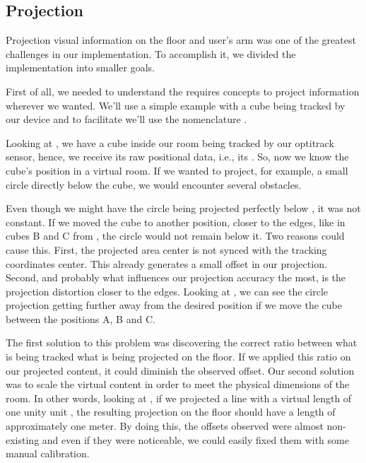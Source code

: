 \subsection{Projection}
\label{prototype-projection}


Projection visual information on the floor and user's arm was one of the greatest challenges in our implementation. To accomplish it, we divided the implementation into smaller goals.

First of all, we needed to understand the requires concepts to project information wherever we wanted. We'll use a simple example with a cube being tracked by 
our device and to facilitate we'll use the nomenclature .


Looking at , we have a cube inside our room being tracked by our optitrack sensor, hence, we receive its raw positional data, i.e., its .
So, now we know the cube's position in a virtual room. If we wanted to project, for example, a small circle directly below the cube, we would encounter several obstacles.



Even though we might have the circle being projected perfectly below , it was not constant.
If we moved the cube to another position, closer to the edges, like in cubes B and C from , the circle would not remain below it. 
Two reasons could cause this. First, the projected area center is not synced with the tracking coordinates center. 
This already generates a small offset in our projection. 
Second, and probably what influences our projection accuracy the most, is the projection distortion closer to the edges.
Looking at , we can see the circle projection getting further away from the desired position if we move the cube between the positions A, B and C.

The first solution to this problem was discovering the correct ratio between what is being tracked what is being projected on the floor. 
If we applied this ratio on our projected content, it could diminish the observed offset. 
Our second solution was to scale the virtual content in order to meet the physical dimensions of the room. 
In other words, looking at , if we projected a line with a virtual length of one unity unit , the resulting projection on the floor should have a length of approximately one meter.
By doing this, the offsets observed were almost non-existing and even if they were noticeable, we could easily fixed them with some manual calibration.

